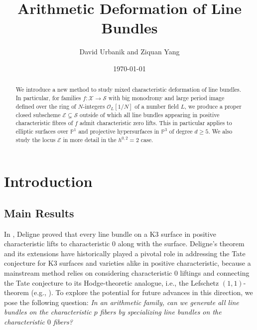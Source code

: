 \documentclass[letter, 11pt]{article}
\title{\textbf{\large{Arithmetic Deformation of Line Bundles}}}
\author{\normalsize{David Urbanik and Ziquan Yang}}
\date{\today}
\theoremstyle{plain}
\theoremstyle{definition}
\newcommand{\IA}{\mathbb{A}}
\newcommand{\<}{\langle}
\renewcommand{\>}{\rangle}
\newcommand{\sA}{\mathcal{A}}
\begin{document}
\maketitle

\begin{abstract}
    We introduce a new method to study mixed characteristic deformation of line bundles. In particular, for families $f : \mathcal{X} \to \mathcal{S}$ with big monodromy and large period image defined over the ring of $N$-integers $\mathcal{O}_{L}[1/N]$ of a number field $L$, we produce a proper closed subscheme $\mathcal{E} \subsetneq \mathcal{S}$ outside of which all line bundles appearing in positive characteristic fibres of $f$ admit characteristic zero lifts. This in particular applies to elliptic surfaces over $\mathbb{P}^1$ and projective hypersurfaces in $\mathbb{P}^3$ of degree $d \geq 5$. We also study the locus $\mathcal{E}$ in more detail in the $h^{0, 2} = 2$ case.
\end{abstract}

\tableofcontents



\section{Introduction}


\subsection{Main Results} \label{sec: main results}

In \cite{Del02}, Deligne proved that every line bundle on a K3 surface in positive characteristic lifts to characteristic $0$ along with the surface. Deligne's theorem and its extensions have historically played a pivotal role in addressing the Tate conjecture for K3 surfaces and varieties alike in positive characteristic, because a mainstream method relies on considering characteristic $0$ liftings and connecting the Tate conjecture to its Hodge-theoretic analogue, i.e., the Lefschetz $(1, 1)$-theorem (e.g., \cite{Nygaard, NO, MPTate, HYZ}). To explore the potential for future advances in this direction, we pose the following question: \textit{In an arithmetic family, can we generate all line bundles on the characteristic $p$ fibers by specializing line bundles on the characteristic $0$ fibers?}
\end{document}

